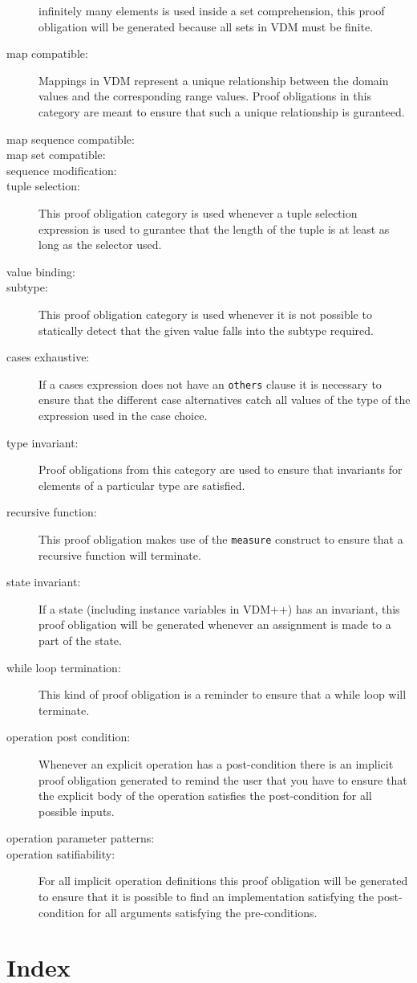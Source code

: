 \documentclass{overturerepchap}
\begin{document}
\begin{description}
  infinitely many elements is used inside a set comprehension, this
  proof obligation will be generated because all sets in VDM must be finite.
\item[map compatible:] Mappings in VDM represent a unique relationship
  between the domain values and the corresponding range values. Proof
  obligations in this category are meant to ensure that such a unique
  relationship is guranteed.
\item[map sequence compatible:]
\item[map set compatible:] 
\item[sequence modification:]
\item[tuple selection:] This proof obligation category is used
  whenever a tuple selection expression is used to
  gurantee that the length of the tuple is at least as long as the
  selector used.
\item[value binding:] 
\item[subtype:] This proof obligation category is used whenever it is
  not possible to statically detect that the given value
  falls into the subtype required.
\item[cases exhaustive:] If a cases expression does not have an
  \texttt{others} clause it is necessary to ensure that the
  different case alternatives catch all values of the type of the
  expression used in the case choice.
\item[type invariant:] Proof obligations from this category are used
  to ensure that invariants for elements of a particular type are satisfied.
\item[recursive function:] This proof obligation makes use of the
  \texttt{measure} construct to ensure that a recursive function
  will terminate. 
\item[state invariant:] If a state (including instance variables in
  VDM++) has an invariant, this proof obligation will be generated
  whenever an assignment is made to a part of the state.
\item[while loop termination:] This kind of proof obligation is a
  reminder to ensure that a while loop will terminate.
\item[operation post condition:] Whenever an explicit operation has a
  post-condition there is an implicit proof obligation generated to
  remind the user that you have to ensure that the explicit body
  of the operation satisfies the post-condition for all possible inputs.
\item[operation parameter patterns:] 
\item[operation satifiability:] For all implicit operation definitions
  this proof obligation will be generated to ensure that it is
  possible to find an implementation satisfying the post-condition for all
  arguments satisfying the pre-conditions. 
\end{description}

\newpage
\chapter{Index}\label{sec:index}
\printindex
{}
\end{document}
